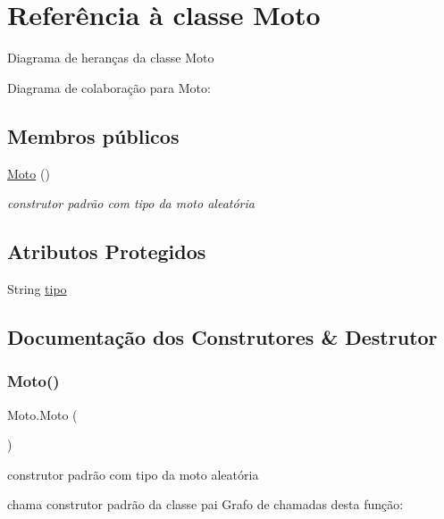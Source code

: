 \hypertarget{class_moto}{}\section{Referência à classe Moto}
\label{class_moto}


Diagrama de heranças da classe Moto


Diagrama de colaboração para Moto\+:
\subsection*{Membros públicos}
\begin{DoxyCompactItemize}
\item 
\mbox{\hyperlink{class_moto_af900d6c1d6b9a69fb6b8bdb0c3401603}{Moto}} ()
\begin{DoxyCompactList}\small\item\em construtor padrão com tipo da moto aleatória \end{DoxyCompactList}\end{DoxyCompactItemize}
\subsection*{Atributos Protegidos}
\begin{DoxyCompactItemize}
\item 
String \mbox{\hyperlink{class_moto_a98533b801c6277bdac415e9d21f74efe}{tipo}}
\end{DoxyCompactItemize}


\subsection{Documentação dos Construtores \& Destrutor}
\mbox{\label{class_moto_af900d6c1d6b9a69fb6b8bdb0c3401603}} 
\subsubsection{\texorpdfstring{Moto()}{Moto()}}
{\footnotesize\ttfamily Moto.\+Moto (\begin{DoxyParamCaption}{ }\end{DoxyParamCaption})}



construtor padrão com tipo da moto aleatória 

chama construtor padrão da classe pai Grafo de chamadas desta função\+:


